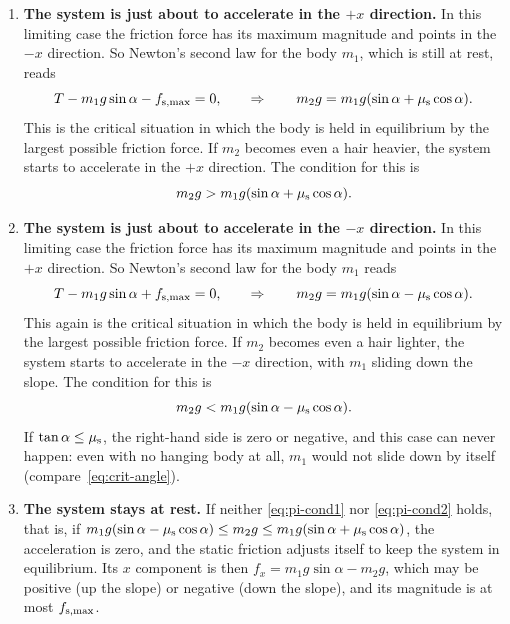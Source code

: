 \documentclass[11pt,a4paper]{article}
\begin{document}
\begin{enumerate}
  \item \textbf{The system is just about to accelerate in the $+x$ direction.} In this limiting case
    the friction force has its maximum magnitude and points in the $-x$ direction. So Newton's second
    law for the body $m_1$, which is still at rest, reads
    \begin{equation}\label{eq:pi-case1}
      T - m_1 g\sin\alpha - f_{\mathrm{s,max}} = 0 , \qquad \Rightarrow \qquad
      m_2 g = m_1 g(\sin\alpha + \mu_{\mathrm{s}}\cos\alpha) .
    \end{equation}
    This is the critical situation in which the body is held in equilibrium by the largest possible
    friction force. If $m_2$ becomes even a hair heavier, the system starts to accelerate in the $+x$
    direction. The condition for this is
    \begin{equation}\label{eq:pi-cond1}
      m_2 g > m_1 g(\sin\alpha + \mu_{\mathrm{s}}\cos\alpha) .
    \end{equation}
  \item \textbf{The system is just about to accelerate in the $-x$ direction.} In this limiting case
    the friction force has its maximum magnitude and points in the $+x$ direction. So Newton's second
    law for the body $m_1$ reads
    \begin{equation}\label{eq:pi-case2}
      T - m_1 g\sin\alpha + f_{\mathrm{s,max}} = 0 , \qquad \Rightarrow \qquad
      m_2 g = m_1 g(\sin\alpha - \mu_{\mathrm{s}}\cos\alpha) .
    \end{equation}
    This again is the critical situation in which the body is held in equilibrium by the largest
    possible friction force. If $m_2$ becomes even a hair lighter, the system starts to accelerate in
    the $-x$ direction, with $m_1$ sliding down the slope. The condition for this is
    \begin{equation}\label{eq:pi-cond2}
      m_2 g < m_1 g(\sin\alpha - \mu_{\mathrm{s}}\cos\alpha) .
    \end{equation}
    If $\tan\alpha \leq \mu_{\mathrm{s}}$, the right-hand side is zero or negative, and this case can never
    happen: even with no hanging body at all, $m_1$ would not slide down by itself
    (compare~\eqref{eq:crit-angle}).
  \item \textbf{The system stays at rest.} If neither \eqref{eq:pi-cond1} nor \eqref{eq:pi-cond2}
    holds, that is, if $m_1 g(\sin\alpha - \mu_{\mathrm{s}}\cos\alpha) \leq m_2 g \leq m_1 g(\sin\alpha +
    \mu_{\mathrm{s}}\cos\alpha)$, the acceleration is zero, and the static friction adjusts itself to keep
    the system in equilibrium. Its $x$ component is then $f_x = m_1 g\sin\alpha - m_2 g$, which may be
    positive (up the slope) or negative (down the slope), and its magnitude is at most $f_{\mathrm{s,max}}$.
\end{enumerate}
\end{document}
